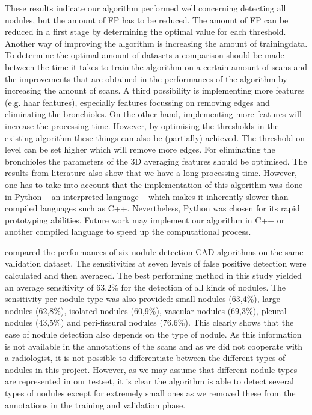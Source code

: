 These results indicate our algorithm performed well concerning detecting all
nodules, but the amount of FP has to be reduced. The amount of FP can be reduced
in a first stage by determining the optimal value for each threshold.
Another way of improving the algorithm is increasing the amount of trainingdata.
To determine the optimal amount of datasets a comparison should be made between
the time it takes to train the algorithm on a certain amount of scans and the
improvements that are obtained in the performances of the algorithm by
increasing the amount of scans. A third possibility is implementing more
features (e.g. haar features), especially features focussing on removing edges
and eliminating the bronchioles. On the other hand, implementing more features
will increase the processing time. However, by optimising the thresholds in the
existing algorithm these things can also be (partially) achieved. The threshold
on level can be set higher which will remove more edges. For eliminating the
bronchioles the parameters of the 3D averaging features should be optimised. The
results from literature also show that we have a long processing time. However,
one has to take into account that the implementation of this algorithm was done
in Python -- an interpreted language -- which makes it inherently slower than
compiled languages such as C++. Nevertheless, Python was chosen for its rapid
prototyping abilities. Future work may implement our algorithm in C++ or another
compiled language to speed up the computational process.


\cite{ginneken} compared the performances of six nodule detection CAD algorithms
on the same validation dataset. The sensitivities at seven levels of false
positive detection were calculated and then averaged. The best performing method
in this study yielded an average sensitivity of 63,2\% for the detection of all
kinds of nodules. The sensitivity per nodule type was also provided: small
nodules (63,4\%), large nodules (62,8\%), isolated nodules (60,9\%), vascular
nodules (69,3\%), pleural nodules (43,5\%) and peri-fissural nodules (76,6\%).
This clearly shows that the ease of nodule detection also depends on the type of
nodule. As this information is not available in the annotations of the scans and
as we did not cooperate with a radiologist, it is not possible to differentiate
between the different types of nodules in this project. However, as we may
assume that different nodule types are represented in our testset, it is clear
the algorithm is able to detect several types of nodules except for extremely
small ones as we removed these from the annotations in the training and
validation phase.

